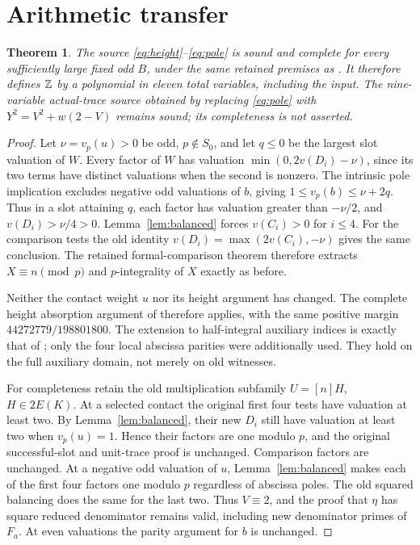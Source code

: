 \documentclass[11pt,a4paper]{article}
\newtheorem{theorem}{Theorem}[section]
\begin{document}
\section{Arithmetic transfer}
\begin{theorem}\label{thm:transfer}
The source \eqref{eq:height}--\eqref{eq:pole} is sound and complete
for every sufficiently large fixed odd $B$, under the same retained
premises as \cite{FullAux}. It therefore defines $\mathbb Z$ by a polynomial
in eleven total variables, including the input. The nine-variable
actual-trace source obtained by replacing \eqref{eq:pole} with
$Y^2=V^2+w(2-V)$ remains sound; its completeness is not asserted.
\end{theorem}
\begin{proof}
Let $\nu=v_p(u)>0$ be odd, $p\notin S_0$, and let $q\le0$
be the largest slot valuation of $W$. Every factor of $W$ has
valuation $\min(0,2v(D_i)-\nu)$, since its two terms have distinct
valuations when the second is nonzero. The intrinsic pole implication
excludes negative odd valuations of $b$, giving
$1\le v_p(b)\le\nu+2q$. Thus in a slot attaining $q$, each factor
has valuation greater than $-\nu/2$, and $v(D_i)>\nu/4>0$.
Lemma~\ref{lem:balanced} forces $v(C_i)>0$ for $i\le4$.
For the comparison tests the old identity
$v(D_i)=\max(2v(C_i),-\nu)$ gives the same conclusion. The retained
formal-comparison theorem therefore extracts $X\equiv n\pmod p$
and $p$-integrality of $X$ exactly as before.

Neither the contact weight $u$ nor its height argument has changed.
The complete height absorption argument of \cite{Derivative} therefore
applies, with the same positive margin $44272779/198801800$.
The extension to half-integral auxiliary indices is exactly that of
\cite{FullAux}; only the four local abscissa parities were additionally
used. They hold on the full auxiliary domain, not merely on old witnesses.

For completeness retain the old multiplication subfamily
$U=[n]H$, $H\in2E(K)$. At a selected contact the original first four
tests have valuation at least two. By Lemma~\ref{lem:balanced}, their
new $D_i$ still have valuation at least two when $v_p(u)=1$.
Hence their factors are one modulo $p$, and the original successful-slot
and unit-trace proof is unchanged. Comparison factors are unchanged.
At a negative odd valuation of $u$, Lemma~\ref{lem:balanced} makes
each of the first four factors one modulo $p$ regardless of abscissa
poles. The old squared balancing does the same for the last two.
Thus $V\equiv2$, and the proof that $\eta$ has square reduced
denominator remains valid, including new denominator primes of $F_a$.
At even valuations the parity argument for $b$ is unchanged.


\end{proof}
\end{document}
